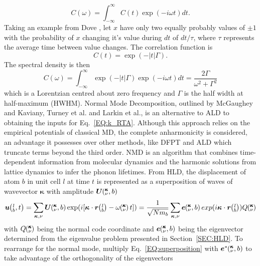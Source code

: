 %
\begin{equation}
C(\omega)=\int_{-\infty}^{\infty}C(t) \exp(-i\omega t) dt.
\end{equation}
%
Taking an example from Dove \cite{dove_introduction_1993-3}, let $x$ have only two equally probably values of $\pm 1$ with the probability of $x$ changing it's value during $dt$ of $dt/\tau$, where $\tau$ represents the average time between value changes. The correlation function is
%
\begin{equation}
C(t)=\exp\left (-|t|\Gamma \right ).
\end{equation}
%
The spectral density is then
\begin{equation}\label{EQ:lorentzian_1}
C(\omega)=\int_{-\infty}^{\infty}\exp\left (-|t|\Gamma \right ) \exp(-i\omega t)dt=\frac{2\Gamma}{\omega^2 +\Gamma^2}
\end{equation}
which is a Lorentzian centred about zero frequency and $\Gamma$ is the half width at half-maximum (HWHM).
Normal Mode Decomposition, outlined by McGaughey and Kaviany\cite{PhysRevB.71.184305}, Turney et al.\cite {PhysRevB.81.081411} and Larkin et al.,\cite{jason_inpress} is an alternative to ALD to obtaining the inputs for Eq.~\ref{EQ:k_RTA}. Although this approach relies on the empirical potentials of classical MD, the complete anharmonicity is considered, an advantage it possesses over other methods, like DFPT and ALD which truncate terms beyond the third order. NMD is an algorithm that combines time-dependent information from molecular dynamics and the harmonic solutions from lattice dynamics to infer the phonon lifetimes. From HLD, the displacement of atom $b$ in unit cell $l$ at time $t$ is represented as a superposition of waves of wavevector $\bm{\kappa}$ with amplitude $\bm{U}\mspace{-4.0mu}\left(\mspace{-8.0mu} \begin{smallmatrix} &\pmb{\kappa} \\ &\nu \end{smallmatrix} \mspace{-2.0mu},b\right)$
%
\begin{equation}\label{EQ:superposition}
\bm{u}\lbt=\sum_{\bm{\kappa},\nu}\bm{U}\kvb \exp(i[\bm{\kappa}\cdot\bm{r}\lb-\omega\kv t])=\frac{1}{\sqrt{Nm_b}}\sum_{\bm{\kappa},\nu}\bm{e}\kvb exp(i\bm{\kappa}\cdot\bm{r}\lb)Q\kv
\end{equation}
%
with $Q\mspace{-4.0mu}\left(\mspace{-8.0mu} \begin{smallmatrix}&\pmb{\kappa} \\&\nu\end{smallmatrix} \mspace{-3.0mu}\right)$ being the normal code coordinate and $\bm{e}\mspace{-4.0mu}\left(\mspace{-8.0mu} \begin{smallmatrix} &\pmb{\kappa} \\ &\nu \end{smallmatrix} \mspace{-2.0mu},b\right)$ being the eigenvector determined from the eigenvalue problem presented in Section~\ref{SEC:HLD}. To rearrange for the normal mode, multiply Eq.~\ref{EQ:superposition} with $\bm{e}^*\mspace{-4.0mu}\left(\mspace{-8.0mu} \begin{smallmatrix} &\pmb{\kappa} \\ &\nu \end{smallmatrix} \mspace{-2.0mu},b\right)$ to take advantage of the orthogonality of the eigenvectors
